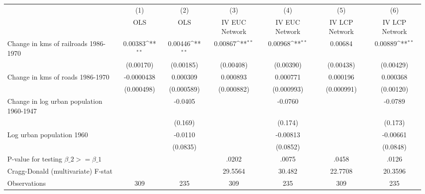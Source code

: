 {
\def\sym#1{\ifmmode^{#1}\else\(^{#1}\)\fi}
\begin{tabular}{l*{6}{c}}
\hline\hline
                &\multicolumn{1}{c}{(1)}&\multicolumn{1}{c}{(2)}&\multicolumn{1}{c}{(3)}&\multicolumn{1}{c}{(4)}&\multicolumn{1}{c}{(5)}&\multicolumn{1}{c}{(6)}\\
                &\multicolumn{1}{c}{OLS}&\multicolumn{1}{c}{OLS}&\multicolumn{1}{c}{IV EUC Network}&\multicolumn{1}{c}{IV EUC Network}&\multicolumn{1}{c}{IV LCP Network}&\multicolumn{1}{c}{IV LCP Network}\\
\hline
Change in kms of railroads 1986-1970&  0.00383\sym{**} &  0.00446\sym{**} &  0.00867\sym{**} &  0.00968\sym{**} &  0.00684         &  0.00889\sym{**} \\
                &(0.00170)         &(0.00185)         &(0.00408)         &(0.00390)         &(0.00438)         &(0.00429)         \\
[1em]
Change in kms of roads 1986-1970&-0.0000438         & 0.000309         & 0.000893         & 0.000771         & 0.000196         & 0.000368         \\
                &(0.000498)         &(0.000589)         &(0.000882)         &(0.000993)         &(0.000991)         &(0.00120)         \\
[1em]
Change in log urban population 1960-1947&                  &  -0.0405         &                  &  -0.0760         &                  &  -0.0789         \\
                &                  &  (0.169)         &                  &  (0.174)         &                  &  (0.173)         \\
[1em]
Log urban population 1960&                  &  -0.0110         &                  & -0.00813         &                  & -0.00661         \\
                &                  & (0.0835)         &                  & (0.0852)         &                  & (0.0848)         \\
\hline
P-value for testing $\beta\_{2} >= \beta\_{1}$&                  &                  &    .0202         &    .0075         &    .0458         &    .0126         \\
Cragg-Donald (multivariate) F-stat&                  &                  &  29.5564         &   30.482         &  22.7708         &  20.3596         \\
Observations    &      309         &      235         &      309         &      235         &      309         &      235         \\
\hline\hline
\end{tabular}
}
